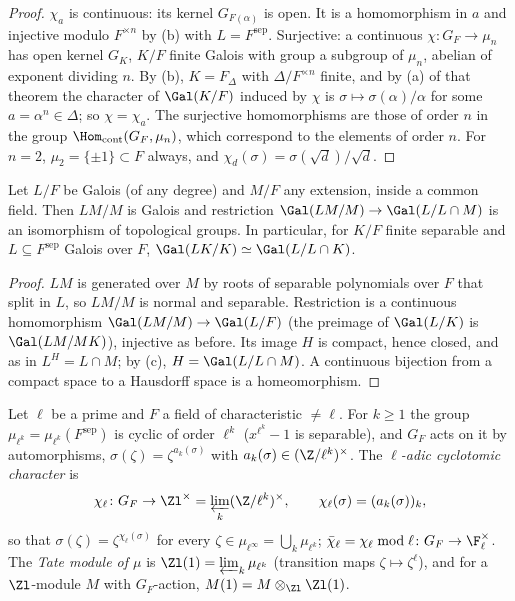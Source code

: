 \begin{proof}
$\chi_a$ is continuous: its kernel $G_{F(\alpha)}$ is open. It is a homomorphism in $a$ and injective modulo $F^{\times n}$ by (b)
with $L=F^{\mathrm{sep}}$. Surjective: a continuous $\chi\colon G_F\to\mu_n$ has open kernel $G_K$, $K/F$ finite Galois with group a subgroup of $\mu_n$, abelian of
exponent dividing $n$. By (b), $K=F_\Delta$ with $\Delta/F^{\times n}$ finite, and by (a) of that theorem the character of $\Gal(K/F)$ induced by
$\chi$ is $\sigma\mapsto\sigma(\alpha)/\alpha$ for some $a=\alpha^n\in\Delta$; so $\chi=\chi_a$. The surjective homomorphisms are those of order $n$ in the group
$\Hom_{\mathrm{cont}}(G_F,\mu_n)$, which correspond to the elements of order $n$. For $n=2$, $\mu_2=\{\pm1\}\subset F$ always, and $\chi_d(\sigma)=\sigma(\sqrt d)/\sqrt d$.
\end{proof}

\begin{corollary}\label{cor:galois:translation-infinite}
Let $L/F$ be Galois (of any degree) and $M/F$ any extension, inside a common field. Then $LM/M$ is Galois and restriction $\Gal(LM/M)\to\Gal(L/L\cap M)$ is an
isomorphism of topological groups. In particular, for $K/F$ finite separable and $L\subseteq F^{\mathrm{sep}}$ Galois over $F$, $\Gal(LK/K)\simeq\Gal(L/L\cap K)$.
\end{corollary}

\begin{proof}
$LM$ is generated over $M$ by roots of separable polynomials over $F$ that split in $L$, so $LM/M$ is normal and separable. Restriction is a continuous
homomorphism $\Gal(LM/M)\to\Gal(L/F)$ (the preimage of $\Gal(L/K)$ is $\Gal(LM/MK)$), injective as before. Its image $H$ is compact, hence closed, and as in
 $L^H=L\cap M$; by (c), $H=\Gal(L/L\cap M)$. A continuous bijection from a compact space to a Hausdorff space is a
homeomorphism.
\end{proof}

\begin{definition}\label{def:galois:cyclotomic-character}
Let $\ell$ be a prime and $F$ a field of characteristic $\ne\ell$. For $k\ge1$ the group $\mu_{\ell^k}=\mu_{\ell^k}(F^{\mathrm{sep}})$ is cyclic of order $\ell^k$
($x^{\ell^k}-1$ is separable), and $G_F$ acts on it by automorphisms, $\sigma(\zeta)=\zeta^{a_k(\sigma)}$ with $a_k(\sigma)\in(\Z/\ell^k)^\times$. The
\emph{$\ell$-adic cyclotomic character} is
\[
\chi_\ell\colon G_F\to\Zl^\times=\varprojlim_k(\Z/\ell^k)^\times,\qquad\chi_\ell(\sigma)=(a_k(\sigma))_k,
\]
so that $\sigma(\zeta)=\zeta^{\chi_\ell(\sigma)}$ for every $\zeta\in\mu_{\ell^\infty}=\bigcup_k\mu_{\ell^k}$; $\bar\chi_\ell=\chi_\ell\bmod\ell\colon G_F\to\F_\ell^\times$. The
\emph{Tate module of $\mu$} is $\Zl(1)=\varprojlim_k\mu_{\ell^k}$ (transition maps $\zeta\mapsto\zeta^\ell$), and for a $\Zl$-module $M$ with $G_F$-action,
$M(1)=M\otimes_{\Zl}\Zl(1)$.
\end{definition}


